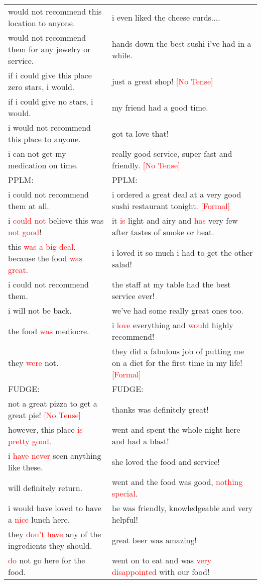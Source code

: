 \documentclass[11pt]{article}
\newcommand{\senc}[1]{\textcolor{red}{#1}}
\begin{document}
\begin{table}[ht]
\begin{tabular}{m{}m{}}
	\quad would not recommend this location to anyone.&\quad i even liked the cheese curds....\\
	\quad would not recommend them for any jewelry or service.&\quad hands down the best sushi i've had in a while.\\
	\quad if i could give this place zero stars, i would.&\quad just a great shop! \senc{[No Tense]}\\
	\quad if i could give no stars, i would.&\quad my friend had a good time.\\
	\quad i would not recommend this place to anyone.&\quad got ta love that!\\
	\quad i {can} not get my medication on time.&\quad really good service, super fast and friendly. \senc{[No Tense]}\\
	\midrule

PPLM:&PPLM:\\
	\quad i could not recommend them at all.&\quad i ordered a great deal at a very good sushi restaurant tonight. \senc{[Formal]}\\
	\quad i \senc{could not} believe this was \senc{not good}!&\quad it \senc{is} light and airy and \senc{has} very few after tastes of smoke or heat.\\
	\quad this \senc{was a big deal}, because the food \senc{was great}. &\quad i loved it so much i had to get the other salad!\\
	\quad i could not recommend them.&\quad the staff at my table had the best service ever!\\
	\quad i will not be back.&\quad we've had some really great ones too.\\
	\quad the food \senc{was} mediocre.&\quad i \senc{love} everything and \senc{would} highly recommend!\\
	\quad they \senc{were} not.&\quad they did a fabulous job of putting me on a diet for the first time in my life! \senc{[Formal]}\\
	\midrule

FUDGE:&FUDGE:\\
    \quad not a great pizza to get a great pie! \senc{[No Tense]}& \quad thanks was definitely great!\\
    \quad however, this place \senc{is pretty good}. & \quad went and spent the whole night here and had a blast!\\
    \quad i \senc{have never} seen anything like these. & \quad she loved the food and service!\\
    \quad will definitely return. & \quad went and the food was good, \senc{nothing special}.\\
    \quad i would have loved to have a \senc{nice} lunch here. & \quad he was friendly, knowledgeable and very helpful! \\
    \quad they \senc{don't have} any of the ingredients they should. & \quad great beer was amazing!\\
    \quad \senc{do} not go here for the food. & \quad went on to eat and was \senc{very disappointed} with our food!\\
	\midrule


\end{tabular}
\end{table}
\end{document}
